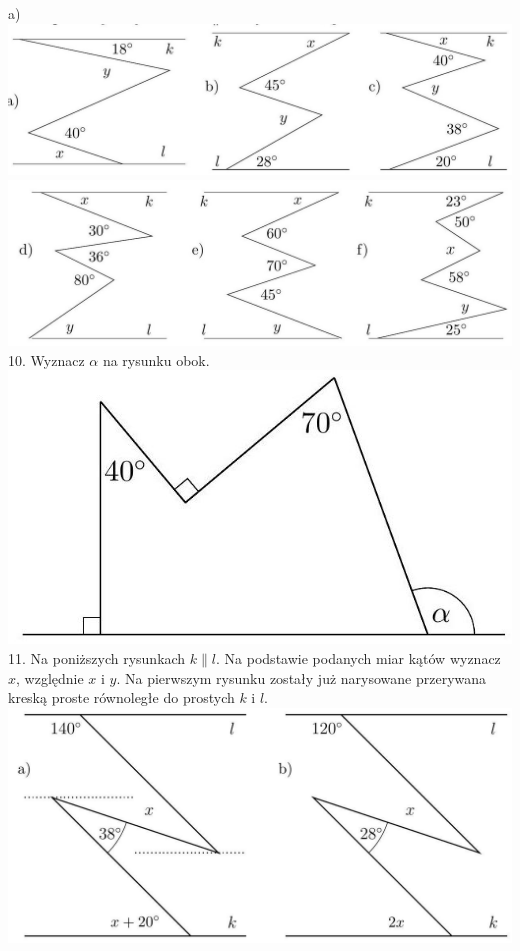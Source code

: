 \documentclass[10pt]{article}
\begin{document}
a)\\
\includegraphics[max width=\textwidth, center]{2024_11_21_71f62bd117d375398909g-012(1)}\\
\includegraphics[max width=\textwidth, center]{2024_11_21_71f62bd117d375398909g-013(1)}\\
10. Wyznacz \(\alpha\) na rysunku obok.\\
\includegraphics[max width=\textwidth, center]{2024_11_21_71f62bd117d375398909g-013}\\
11. Na poniższych rysunkach \(k \| l\). Na podstawie podanych miar kątów wyznacz \(x\), względnie \(x\) i \(y\). Na pierwszym rysunku zostały już narysowane przerywana kreską proste równoległe do prostych \(k\) i \(l\).\\
\includegraphics[max width=\textwidth, center]{2024_11_21_71f62bd117d375398909g-013(2)}\\
\end{document}
